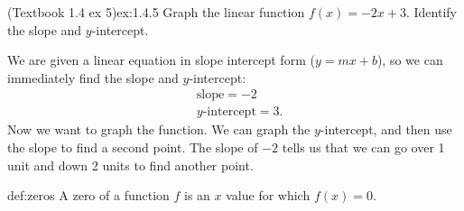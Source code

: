 \documentclass{article}
\begin{document}
\begin{example}{(Textbook 1.4 ex 5)}{ex:1.4.5}
    Graph the linear function $f(x)=-2x+3$. Identify the slope and $y$-intercept.
\end{example}
\begin{solution}
    We are given a linear equation in slope intercept form ($y=mx+b$), so we can immediately find the slope and $y$-intercept:
    \begin{align*}
        &\text{slope}=-2\\
        &y\text{-intercept}=3.
    \end{align*}
    Now we want to graph the function. We can graph the $y$-intercept, and then use the slope to find a second point. The slope of $-2$ tells us that we can go over 1 unit and down 2 units to find another point.
    \begin{center}
    \end{center}
\end{solution}

\begin{definition}{}{def:zeros}
    A zero of a function $f$ is an $x$ value for which $f(x)=0$.
\end{definition}
\end{document}
